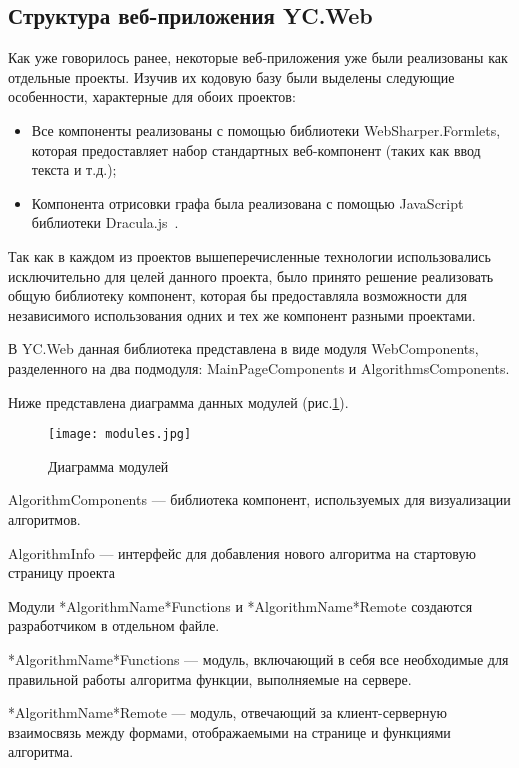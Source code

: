 \documentclass[14pt]{matmex-diploma-custom}
\begin{document}
\newpage
\subsection{Структура веб-приложения YC.Web}

Как уже говорилось ранее, некоторые веб-приложения уже были реализованы как отдельные проекты. Изучив их кодовую базу были выделены следующие особенности, характерные для обоих проектов:

\begin{itemize}
    \item Все компоненты реализованы с помощью библиотеки 
    \linebreak WebSharper.Formlets, которая предоставляет набор стандартных веб-компонент (таких как ввод текста и т.д.);
    \item Компонента отрисовки графа была реализована с помощью JavaScript библиотеки Dracula.js~\cite{dracula}.
\end{itemize}


Так как в каждом из проектов вышеперечисленные технологии использовались исключительно для целей данного проекта, было принято решение реализовать общую библиотеку компонент, которая бы предоставляла возможности для независимого использования одних и тех же компонент разными проектами.

В YC.Web данная библиотека представлена в виде модуля \linebreak WebComponents, разделенного на два подмодуля: MainPageComponents и AlgorithmsComponents. 	

Ниже представлена диаграмма данных модулей (рис.\ref{pic3}).

\begin{figure}[ht]
\centering
\texttt{[image: modules.jpg]}
\caption{Диаграмма модулей}
\label{pic3}
\end{figure}

AlgorithmComponents --- библиотека компонент, используемых для  визуализации алгоритмов.

AlgorithmInfo --- интерфейс для добавления нового алгоритма на стартовую страницу проекта

Модули *AlgorithmName*Functions и *AlgorithmName*Remote создаются разработчиком в отдельном файле.

*AlgorithmName*Functions --- модуль, включающий в себя все необходимые для правильной работы алгоритма функции, выполняемые на сервере.

*AlgorithmName*Remote --- модуль, отвечающий за клиент-серверную взаимосвязь между формами, отображаемыми на странице и функциями алгоритма.
\end{document}
